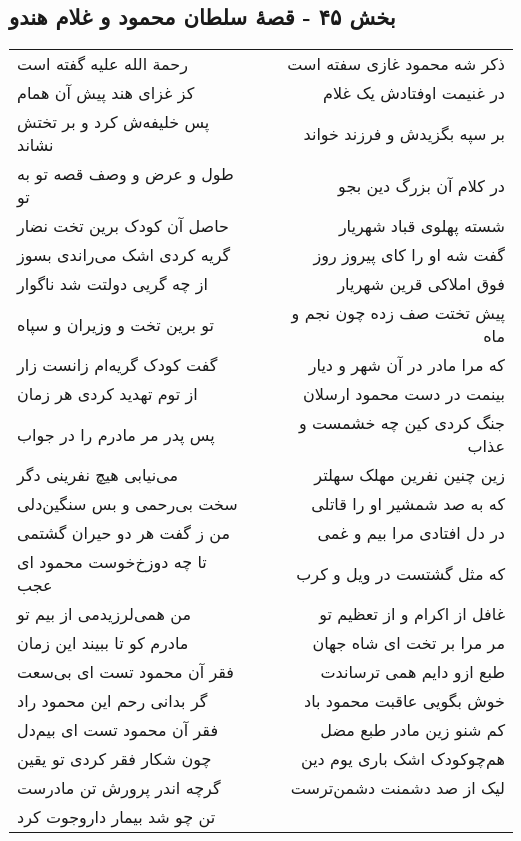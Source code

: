 \begin{center}
\section*{بخش ۴۵ - قصهٔ سلطان محمود و غلام هندو}
\label{sec:sh045}
\begin{longtable}{l p{0.5cm} r}
رحمة الله علیه گفته است
&&
ذکر شه محمود غازی سفته است
\\
کز غزای هند پیش آن همام
&&
در غنیمت اوفتادش یک غلام
\\
پس خلیفه‌ش کرد و بر تختش نشاند
&&
بر سپه بگزیدش و فرزند خواند
\\
طول و عرض و وصف قصه تو به تو
&&
در کلام آن بزرگ دین بجو
\\
حاصل آن کودک برین تخت نضار
&&
شسته پهلوی قباد شهریار
\\
گریه کردی اشک می‌راندی بسوز
&&
گفت شه او را کای پیروز روز
\\
از چه گریی دولتت شد ناگوار
&&
فوق املاکی قرین شهریار
\\
تو برین تخت و وزیران و سپاه
&&
پیش تختت صف زده چون نجم و ماه
\\
گفت کودک گریه‌ام زانست زار
&&
که مرا مادر در آن شهر و دیار
\\
از توم تهدید کردی هر زمان
&&
بینمت در دست محمود ارسلان
\\
پس پدر مر مادرم را در جواب
&&
جنگ کردی کین چه خشمست و عذاب
\\
می‌نیابی هیچ نفرینی دگر
&&
زین چنین نفرین مهلک سهلتر
\\
سخت بی‌رحمی و بس سنگین‌دلی
&&
که به صد شمشیر او را قاتلی
\\
من ز گفت هر دو حیران گشتمی
&&
در دل افتادی مرا بیم و غمی
\\
تا چه دوزخ‌خوست محمود ای عجب
&&
که مثل گشتست در ویل و کرب
\\
من همی‌لرزیدمی از بیم تو
&&
غافل از اکرام و از تعظیم تو
\\
مادرم کو تا ببیند این زمان
&&
مر مرا بر تخت ای شاه جهان
\\
فقر آن محمود تست ای بی‌سعت
&&
طبع ازو دایم همی ترساندت
\\
گر بدانی رحم این محمود راد
&&
خوش بگویی عاقبت محمود باد
\\
فقر آن محمود تست ای بیم‌دل
&&
کم شنو زین مادر طبع مضل
\\
چون شکار فقر کردی تو یقین
&&
هم‌چوکودک اشک باری یوم دین
\\
گرچه اندر پرورش تن مادرست
&&
لیک از صد دشمنت دشمن‌ترست
\\
تن چو شد بیمار داروجوت کرد

\end{longtable}
\end{center}
